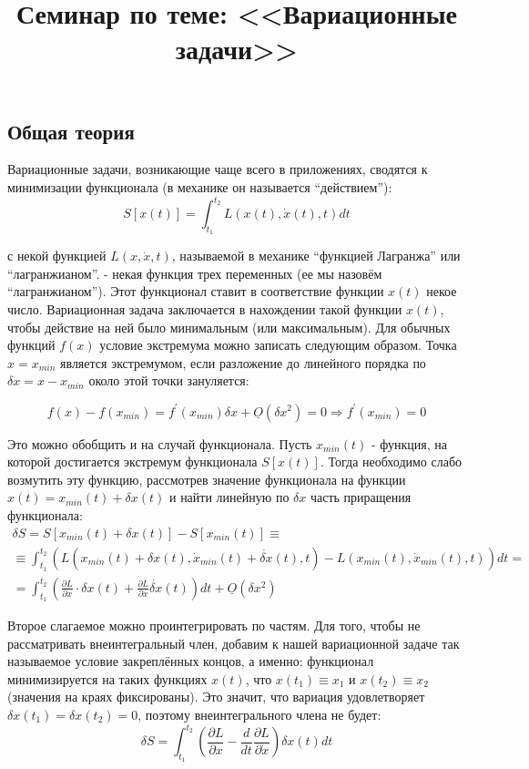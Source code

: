 \documentclass[a4paper,12pt]{article}
\begin{document}
\title{Семинар по теме: <<Вариационные задачи>>}
\maketitle
\subsection*{Общая теория}

Вариационные задачи, возникающие чаще всего в приложениях, сводятся
к минимизации функционала (в механике он называется ``действием''):
\[
S\left[x\left(t\right)\right]=\int_{t_{1}}^{t_{2}}L(x(t),\dot{x}(t),t)dt
\]

\noindent
с некой функцией $L(x,\dot{x},t)$, называемой в механике ``функцией
Лагранжа'' или ``лагранжианом''. - некая функция трех переменных
(ее мы назовём ``лагранжианом''). Этот функционал ставит в соответствие
функции $x(t)$ некое число. Вариационная задача заключается в нахождении
такой функции $x(t)$, чтобы действие на ней было минимальным (или
максимальным).
\noindent
Для обычных функций $f(x)$ условие экстремума можно записать следующим
образом. Точка $x=x_{min}$ является экстремумом, если разложение
до линейного порядка по $\delta x=x-x_{min}$ около этой точки зануляется:

\[
f(x)-f(x_{min})=f^{\prime}(x_{min})\delta x+\underline{O}(\delta x^{2})=0\Rightarrow f^{\prime}(x_{min})=0
\]

\noindent
Это можно обобщить и на случай функционала. Пусть $x_{min}(t)$ -
функция, на которой достигается экстремум функционала $S[x(t)]$.
Тогда необходимо слабо возмутить эту функцию, рассмотрев значение
функционала на функции $x(t)=x_{min}(t)+\delta x(t)$ и найти линейную
по $\delta x$ часть приращения функционала:
\begin{multline*}
\delta S=S[x_{min}(t)+\delta x(t)]-S[x_{min}(t)]\equiv\\
\equiv \int_{t_{1}}^{t_{2}}\left(L(x_{min}(t)+\delta x(t),\dot{x}_{min}(t)+\dot{\delta x}(t),t)-L(x_{min}(t),\dot{x}_{min}(t),t)\right)dt=\\
=\int_{t_{1}}^{t_{2}}\left(\frac{\partial L}{\partial x}\cdot\delta x(t)+\frac{\partial L}{\partial\dot{x}}\dot{\delta x}(t)\right)dt+\underline{O}(\delta x^{2})
\end{multline*}

\noindent
Второе слагаемое можно проинтегрировать по частям. Для того, чтобы
не рассматривать внеинтегральный член, добавим к нашей вариационной
задаче так называемое условие закреплённых концов, а именно: функционал
минимизируется на таких функциях $x(t)$, что $x(t_{1})\equiv x_{1}$
и $x(t_{2})\equiv x_{2}$ (значения на краях фиксированы). Это значит,
что вариация удовлетворяет $\delta x(t_{1})=\delta x(t_{2})=0$, поэтому
внеинтегрального члена не будет:
\[
\delta S=\int_{t_{1}}^{t_{2}}\left(\frac{\partial L}{\partial x}-\frac{d}{dt}\frac{\partial L}{\partial\dot{x}}\right)\delta x(t)dt
\]
\end{document}
